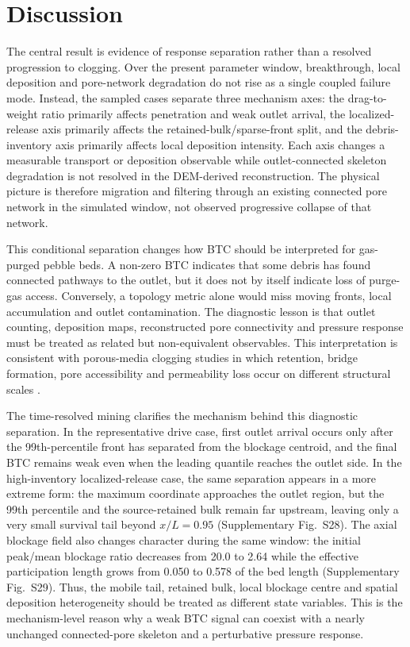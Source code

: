 \documentclass[preprint,12pt,authoryear]{elsarticle}
\newcommand{\BTC}{BTC\xspace}
\begin{document}
\section{Discussion}

The central result is evidence of response separation rather than a resolved progression to clogging. Over the present parameter window, breakthrough, local deposition and pore-network degradation do not rise as a single coupled failure mode. Instead, the sampled cases separate three mechanism axes: the drag-to-weight ratio primarily affects penetration and weak outlet arrival, the localized-release axis primarily affects the retained-bulk/sparse-front split, and the debris-inventory axis primarily affects local deposition intensity. Each axis changes a measurable transport or deposition observable while outlet-connected skeleton degradation is not resolved in the DEM-derived reconstruction. The physical picture is therefore migration and filtering through an existing connected pore network in the simulated window, not observed progressive collapse of that network.

This conditional separation changes how \BTC should be interpreted for gas-purged pebble beds. A non-zero \BTC indicates that some debris has found connected pathways to the outlet, but it does not by itself indicate loss of purge-gas access. Conversely, a topology metric alone would miss moving fronts, local accumulation and outlet contamination. The diagnostic lesson is that outlet counting, deposition maps, reconstructed pore connectivity and pressure response must be treated as related but non-equivalent observables. This interpretation is consistent with porous-media clogging studies in which retention, bridge formation, pore accessibility and permeability loss occur on different structural scales \citep{Mays2005Clogging,Dressaire2017Clogging,Parvan2020Clogging}.

The time-resolved mining clarifies the mechanism behind this diagnostic separation. In the representative drive case, first outlet arrival occurs only after the 99th-percentile front has separated from the blockage centroid, and the final \BTC remains weak even when the leading quantile reaches the outlet side. In the high-inventory localized-release case, the same separation appears in a more extreme form: the maximum coordinate approaches the outlet region, but the 99th percentile and the source-retained bulk remain far upstream, leaving only a very small survival tail beyond $x/L=0.95$ (Supplementary Fig.~S28). The axial blockage field also changes character during the same window: the initial peak/mean blockage ratio decreases from 20.0 to 2.64 while the effective participation length grows from 0.050 to 0.578 of the bed length (Supplementary Fig.~S29). Thus, the mobile tail, retained bulk, local blockage centre and spatial deposition heterogeneity should be treated as different state variables. This is the mechanism-level reason why a weak \BTC signal can coexist with a nearly unchanged connected-pore skeleton and a perturbative pressure response.
\end{document}
